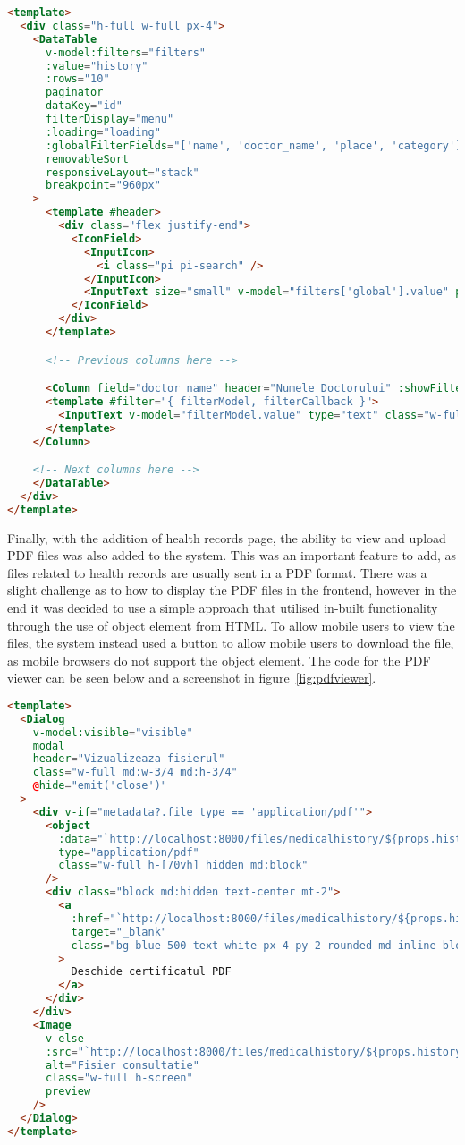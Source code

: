 \begin{lstlisting}[language=HTML, caption=Filter Function for Health Records]
  <template>
  <div class="h-full w-full px-4">
    <DataTable 
      v-model:filters="filters" 
      :value="history" 
      :rows="10" 
      paginator 
      dataKey="id" 
      filterDisplay="menu"
      :loading="loading"
      :globalFilterFields="['name', 'doctor_name', 'place', 'category']"
      removableSort
      responsiveLayout="stack"
      breakpoint="960px"
    >
      <template #header>
        <div class="flex justify-end">
          <IconField>
            <InputIcon>
              <i class="pi pi-search" />
            </InputIcon>
            <InputText size="small" v-model="filters['global'].value" placeholder="Cauta..." />
          </IconField>
        </div>
      </template>

      <!-- Previous columns here -->

      <Column field="doctor_name" header="Numele Doctorului" :showFilterMenu="true">
      <template #filter="{ filterModel, filterCallback }">
        <InputText v-model="filterModel.value" type="text" class="w-full" @input="filterCallback()" placeholder="Cauta dupa doctor" />
      </template>
    </Column>

    <!-- Next columns here -->
    </DataTable>
  </div>
</template>
\end{lstlisting}

Finally, with the addition of health records page, the ability to view and upload PDF files was also added to the system. This was an important feature to add, as files related to health records are usually sent in a PDF format. There was a slight challenge as to how to display the PDF files in the frontend, however in the end it was decided to use a simple approach that utilised in-built functionality through the use of object element from HTML. To allow mobile users to view the files, the system instead used a button to allow mobile users to download the file, as mobile browsers do not support the object element. The code for the PDF viewer can be seen below and a screenshot in figure~\ref{fig:pdfviewer}.

\begin{lstlisting}[language=HTML, caption=PDF viewer Function for Health]<template>
  <Dialog
    v-model:visible="visible"
    modal
    header="Vizualizeaza fisierul"
    class="w-full md:w-3/4 md:h-3/4"
    @hide="emit('close')"
  >
    <div v-if="metadata?.file_type == 'application/pdf'">
      <object
        :data="`http://localhost:8000/files/medicalhistory/${props.historyId}`"
        type="application/pdf"
        class="w-full h-[70vh] hidden md:block"
      />
      <div class="block md:hidden text-center mt-2">
        <a
          :href="`http://localhost:8000/files/medicalhistory/${props.historyId}`"
          target="_blank"
          class="bg-blue-500 text-white px-4 py-2 rounded-md inline-block mb-4"
        >
          Deschide certificatul PDF
        </a>
      </div>
    </div>
    <Image
      v-else
      :src="`http://localhost:8000/files/medicalhistory/${props.historyId}`"
      alt="Fisier consultatie"
      class="w-full h-screen"
      preview
    />
  </Dialog>
</template>
\end{lstlisting}

